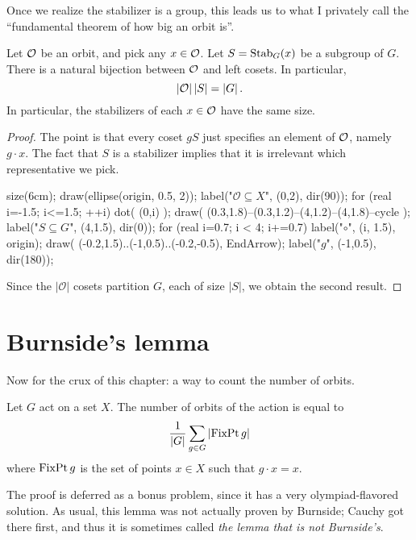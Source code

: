 Once we realize the stabilizer is a group, this leads us to what I privately call the ``fundamental theorem of how big an orbit is''.
\begin{theorem}
	Let $\mathcal O$ be an orbit, and pick any $x \in \mathcal O$.
	Let $S = \operatorname{Stab}_G(x)$ be a subgroup of $G$.
	There is a natural bijection between $\mathcal O$ and left cosets.
	In particular,
	\[ \left\lvert \mathcal O \right\rvert \left\lvert S \right\rvert = \left\lvert G \right\rvert. \]
	In particular, the stabilizers of each $x \in \mathcal O$ have the same size.
\end{theorem}
\begin{proof}
	The point is that every coset $gS$ just specifies an element of $\mathcal O$,
	namely $g \cdot x$. The fact that $S$ is a stabilizer implies
	that it is irrelevant which representative we pick.

	\begin{center}
		\begin{asy}
			size(6cm);
			draw(ellipse(origin, 0.5, 2));
			label("$\mathcal O \subseteq X$", (0,2), dir(90));
			for (real i=-1.5; i<=1.5; ++i) {
				dot( (0,i) );
			}
			draw( (0.3,1.8)--(0.3,1.2)--(4,1.2)--(4,1.8)--cycle );
			label("$S \subseteq G$", (4,1.5), dir(0));
			for (real i=0.7; i < 4; i+=0.7) {
				label("$\circ$", (i, 1.5), origin);
			}
			draw( (-0.2,1.5)..(-1,0.5)..(-0.2,-0.5), EndArrow);
			label("$g$", (-1,0.5), dir(180));
		\end{asy}
	\end{center}

	Since the $\left\lvert \mathcal O \right\rvert$ cosets partition $G$,
	each of size $\left\lvert S \right\rvert$, we obtain the second result.
\end{proof}

\section{Burnside's lemma}
Now for the crux of this chapter: a way to count the number of orbits.
\begin{theorem}
	Let $G$ act on a set $X$.
	The number of orbits of the action is equal to
	\[ \frac{1}{\left\lvert G \right\rvert}
		\sum_{g \in G} \left\lvert \operatorname{FixPt} g \right\rvert \]
	where $\operatorname{FixPt} g$ is the set of points $x \in X$
	such that $g \cdot x = x$.
\end{theorem}
The proof is deferred as a bonus problem,
since it has a very olympiad-flavored solution.
As usual, this lemma was not actually proven by Burnside;
Cauchy got there first, and thus it is sometimes called
\emph{the lemma that is not Burnside's}.

